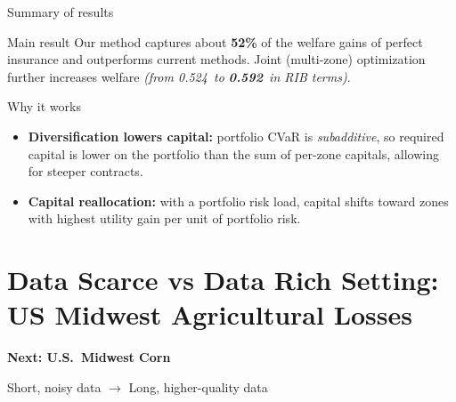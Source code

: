 \documentclass{beamer}
\newcommand{\ribSZ}{0.524}       %
\newcommand{\ribMZ}{0.592}       %
\begin{document}
    \begin{frame}{Summary of results}
        \small
        \begin{block}{Main result}
        Our method captures about \textbf{52\%} of the welfare gains of perfect insurance and outperforms current methods. 
        Joint (multi-zone) optimization further increases welfare \textit{(from \ribSZ\ to \textbf{\ribMZ}\ in RIB terms)}.
        \end{block}

        \begin{block}{Why it works}
            \begin{itemize}\itemsep2pt
              \item \textbf{Diversification lowers capital:} portfolio CVaR is \emph{subadditive}, so required capital is lower on the portfolio than the sum of per-zone capitals, allowing for steeper contracts. 
              \item \textbf{Capital reallocation:} with a portfolio risk load, capital shifts toward zones with highest utility gain per unit of portfolio risk.
            \end{itemize}
            \end{block}
   
        \end{frame}

\section{Data Scarce vs Data Rich Setting: US Midwest Agricultural Losses}
\begin{frame}[plain]
  \centering
  \vspace{2cm}
  
  {\Large \textbf{Next: U.S.\ Midwest Corn}}
  
  \vspace{0.6cm}
  {\large Short, noisy data \;\(\rightarrow\)\; Long, higher-quality data}
  
  \end{frame}
  
\end{document}

